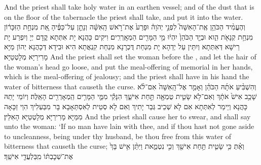 {And the priest shall take holy water in an earthen vessel; and of the dust that is on the floor of the tabernacle the priest shall take, and put it into the water.}{}
{וְהֶעֱמִ֨יד הַכֹּהֵ֥ן אֶֽת־הָאִשָּׁה֮ לִפְנֵ֣י יְהֹוָה֒ וּפָרַע֙ אֶת־רֹ֣אשׁ הָֽאִשָּׁ֔ה וְנָתַ֣ן עַל־כַּפֶּ֗יהָ אֵ֚ת מִנְחַ֣ת הַזִּכָּר֔וֹן מִנְחַ֥ת קְנָאֹ֖ת הִ֑וא וּבְיַ֤ד הַכֹּהֵן֙ יִהְי֔וּ מֵ֥י הַמָּרִ֖ים הַמְאָֽרְרִֽים׃
}
{וִיקִים כָּהֲנָא יָת אִתְּתָא קֳדָם יְיָ וְיִפְרַע יָת רֵישָׁא דְּאִתְּתָא וְיִתֵּין עַל יְדַהָא יָת מִנְחַת דֻּכְרָנָא מִנְחַת קִנְאֲתָא הִיא וּבִידָא דְּכָהֲנָא יְהוֹן מַיָּא מָרִירַיָּא מְלָטְטַיָּא׃}
{And the priest shall set the woman before the \lord, and let the hair of the woman’s head go loose, and put the meal-offering of memorial in her hands, which is the meal-offering of jealousy; and the priest shall have in his hand the water of bitterness that causeth the curse.}{}
{וְהִשְׁבִּ֨יעַ אֹתָ֜הּ הַכֹּהֵ֗ן וְאָמַ֤ר אֶל־הָֽאִשָּׁה֙ אִם־לֹ֨א שָׁכַ֥ב אִישׁ֙ אֹתָ֔ךְ וְאִם־לֹ֥א שָׂטִ֛ית טֻמְאָ֖ה תַּ֣חַת אִישֵׁ֑ךְ הִנָּקִ֕י מִמֵּ֛י הַמָּרִ֥ים הַֽמְאָרְרִ֖ים הָאֵֽלֶּה׃
}
{וְיוֹמֵי יָתַהּ כָּהֲנָא וְיֵימַר לְאִתְּתָא אִם לָא שְׁכֵיב גְּבַר יָתִיךְ וְאִם לָא סְטֵית לְאִסְתַּאָבָא בָּר מִבַּעְלִיךְ הִוַי זַכָּאָה מִמַּיָּא מָרִירַיָּא מְלָטְטַיָּא הָאִלֵּין׃}
{And the priest shall cause her to swear, and shall say unto the woman: ‘If no man have lain with thee, and if thou hast not gone aside to uncleanness, being under thy husband, be thou free from this water of bitterness that causeth the curse;}{}
{וְאַ֗תְּ כִּ֥י שָׂטִ֛ית תַּ֥חַת אִישֵׁ֖ךְ וְכִ֣י נִטְמֵ֑את וַיִּתֵּ֨ן אִ֥ישׁ בָּךְ֙ אֶת־שְׁכׇבְתּ֔וֹ מִֽבַּלְעֲדֵ֖י אִישֵֽׁךְ׃
}
